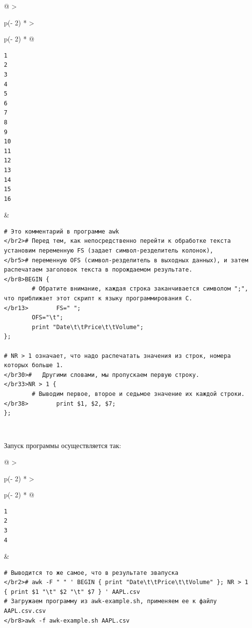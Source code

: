 \documentclass{report}
\begin{document}
\begin{longtable}[]{@{}
  >{\raggedright\arraybackslash}p{(\columnwidth - 2\tabcolsep) * }
  >{\raggedright\arraybackslash}p{(\columnwidth - 2\tabcolsep) * }@{}}
\toprule
\endhead
\begin{minipage}[t]{\linewidth}\raggedright
\begin{verbatim}
1
2
3
4
5
6
7
8
9
10
11
12
13
14
15
16
\end{verbatim}
\end{minipage} & \begin{minipage}[t]{\linewidth}\raggedright
\begin{verbatim}
# Это комментарий в программе awk
</br2># Перед тем, как непосредственно перейти к обработке текста установим переменную FS (задает символ-резделитель колонок),
</br5># переменную OFS (символ-резделитель в выходных данных), и затем распечатаем заголовок текста в порождаемом результате.
</br8>BEGIN {
        # Обратите внимание, каждая строка заканчивается символом ";", что приближает этот скрипт к языку программирования C.
</br13>        FS=" ";
        OFS="\t";
        print "Date\t\tPrice\t\tVolume";
};

# NR > 1 означает, что надо распечатать значения из строк, номера которых больше 1.
</br30>#   Другими словами, мы пропускаем первую строку.
</br33>NR > 1 {
        # Выводим первое, второе и седьмое значение их каждой строки.
</br38>        print $1, $2, $7;
};
\end{verbatim}
\end{minipage} \\ \addlinespace
\bottomrule
\end{longtable}

Запуск программы осуществляется так:

\begin{longtable}[]{@{}
  >{\raggedright\arraybackslash}p{(\columnwidth - 2\tabcolsep) * }
  >{\raggedright\arraybackslash}p{(\columnwidth - 2\tabcolsep) * }@{}}
\toprule
\endhead
\begin{minipage}[t]{\linewidth}\raggedright
\begin{verbatim}
1
2
3
4
\end{verbatim}
\end{minipage} & \begin{minipage}[t]{\linewidth}\raggedright
\begin{verbatim}
# Выводится то же самое, что в результате звапуска
</br2># awk -F " " ' BEGIN { print "Date\t\tPrice\t\tVolume" }; NR > 1 { print $1 "\t" $2 "\t" $7 } ' AAPL.csv
# Загружаем программу из awk-example.sh, применяем ее к файлу AAPL.csv.csv
</br8>awk -f awk-example.sh AAPL.csv
\end{verbatim}
\end{minipage} \\ \addlinespace
\bottomrule
\end{longtable}
\end{document}
